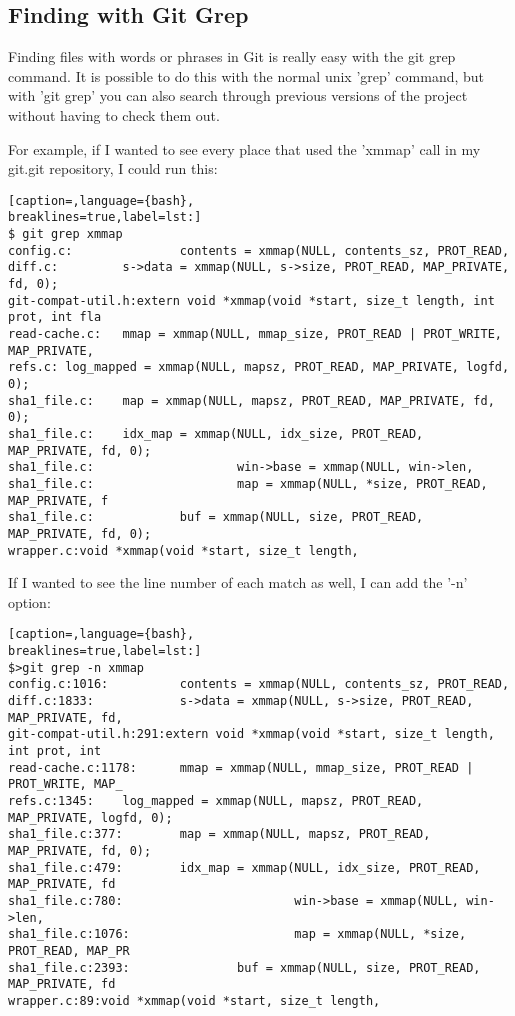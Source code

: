\subsection{Finding with Git Grep}
Finding files with words or phrases in Git is really easy with the git grep
command. It is possible to do this with the normal unix 'grep' command, but
with 'git grep' you can also search through previous versions of the project
without having to check them out.

For example, if I wanted to see every place that used the 'xmmap' call in my
git.git repository, I could run this:
\lstset{basicstyle=\scriptsize, numbers=none, captionpos=b, tabsize=4}
\begin{lstlisting}[caption=,language={bash},
breaklines=true,label=lst:]
$ git grep xmmap
config.c:               contents = xmmap(NULL, contents_sz, PROT_READ,
diff.c:         s->data = xmmap(NULL, s->size, PROT_READ, MAP_PRIVATE, fd, 0);
git-compat-util.h:extern void *xmmap(void *start, size_t length, int prot, int fla
read-cache.c:   mmap = xmmap(NULL, mmap_size, PROT_READ | PROT_WRITE, MAP_PRIVATE,
refs.c: log_mapped = xmmap(NULL, mapsz, PROT_READ, MAP_PRIVATE, logfd, 0);
sha1_file.c:    map = xmmap(NULL, mapsz, PROT_READ, MAP_PRIVATE, fd, 0);
sha1_file.c:    idx_map = xmmap(NULL, idx_size, PROT_READ, MAP_PRIVATE, fd, 0);
sha1_file.c:                    win->base = xmmap(NULL, win->len,
sha1_file.c:                    map = xmmap(NULL, *size, PROT_READ, MAP_PRIVATE, f
sha1_file.c:            buf = xmmap(NULL, size, PROT_READ, MAP_PRIVATE, fd, 0);
wrapper.c:void *xmmap(void *start, size_t length,
\end{lstlisting}

If I wanted to see the line number of each match as well, I can add the '-n'
option:
\lstset{basicstyle=\scriptsize, numbers=none, captionpos=b, tabsize=4}
\begin{lstlisting}[caption=,language={bash},
breaklines=true,label=lst:]
$>git grep -n xmmap
config.c:1016:          contents = xmmap(NULL, contents_sz, PROT_READ,
diff.c:1833:            s->data = xmmap(NULL, s->size, PROT_READ, MAP_PRIVATE, fd,
git-compat-util.h:291:extern void *xmmap(void *start, size_t length, int prot, int
read-cache.c:1178:      mmap = xmmap(NULL, mmap_size, PROT_READ | PROT_WRITE, MAP_
refs.c:1345:    log_mapped = xmmap(NULL, mapsz, PROT_READ, MAP_PRIVATE, logfd, 0);
sha1_file.c:377:        map = xmmap(NULL, mapsz, PROT_READ, MAP_PRIVATE, fd, 0);
sha1_file.c:479:        idx_map = xmmap(NULL, idx_size, PROT_READ, MAP_PRIVATE, fd
sha1_file.c:780:                        win->base = xmmap(NULL, win->len,
sha1_file.c:1076:                       map = xmmap(NULL, *size, PROT_READ, MAP_PR
sha1_file.c:2393:               buf = xmmap(NULL, size, PROT_READ, MAP_PRIVATE, fd
wrapper.c:89:void *xmmap(void *start, size_t length,
\end{lstlisting}


